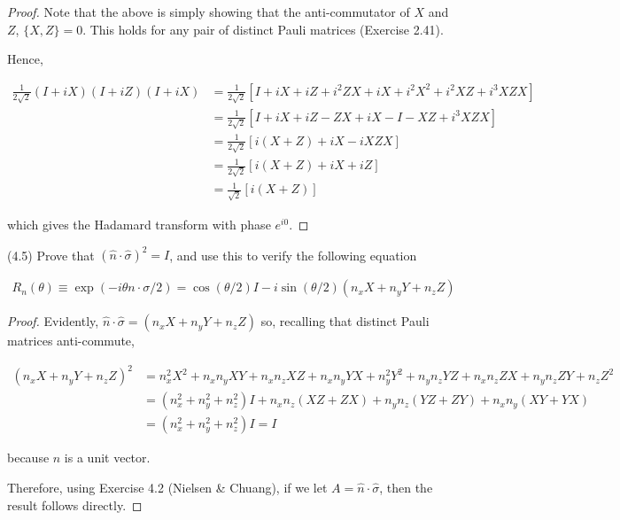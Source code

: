 \documentclass[main.tex]{subfiles}
\begin{document}
\begin{subappendices}
\begin{exercise}
\begin{proof}
Note that the above is simply showing that the anti-commutator of $X$ and $Z$, $\{ X , Z\} = 0$. This holds for any pair of distinct Pauli matrices (Exercise 2.41). 

Hence,

\begin{align*}
	\frac{1}{2\sqrt{2}}( I + iX)( I + iZ)( I + iX) &= \frac{1}{2\sqrt{2}}[I + iX + iZ + i^2ZX + iX + i^2X^2 + i^2XZ + i^3XZX ]\\
	&= \frac{1}{2\sqrt{2}}[I + iX + iZ - ZX  + iX - I - XZ + i^3 XZX] \\
	&= \frac{1}{2\sqrt{2}}[i (X + Z)  + iX -i XZX ]\\
	&= \frac{1}{2\sqrt{2}}[i(X + Z) + iX + iZ ]\\
	&= \frac{1}{\sqrt{2}}[i(X + Z)]
\end{align*}

which gives the Hadamard transform with phase $e^{i0}$. 

\end{proof}
	
\end{exercise}


\begin{exercise} (4.5) Prove that $(\hat{n} \cdot \hat{\sigma} ) ^2 = I$, and use this to verify the following equation

\begin{align*}
R_n(\theta) \equiv \exp(-i \theta n \cdot \sigma / 2) = \cos(\theta /2) I - i \sin(\theta / 2) (n_x X + n_y Y + n_z Z) 	
\end{align*}

\begin{proof}

Evidently, $\hat{n} \cdot \hat{\sigma} = (n_x X + n_y Y + n_z Z)$ so, recalling that distinct Pauli matrices anti-commute,

\begin{align*}
(n_x X + n_y Y + n_z Z)^2 &= n_x^2X^2 + n_xn_y XY + n_x n_z XZ + n_xn_y YX + n_y^2 Y^2 + n_yn_z YZ + n_x n_z ZX + n_y n_z ZY + n_z Z^2 \\
&= (n_x^2 + n_y^2 + n_z^2)I + n_xn_z(XZ + ZX) + n_yn_z (YZ + ZY) + n_x n_y (XY + YX) \\
&= (n_x^2 + n_y^2 + n_z^2)I = I
\end{align*}

because $\hat{n}$ is a unit vector. 
	
Therefore, using Exercise 4.2 (Nielsen \& Chuang), if we let $A = \hat{n} \cdot \hat{\sigma}$, then the result follows directly.  
\end{proof}
\end{exercise}


\end{subappendices}
\end{document}
